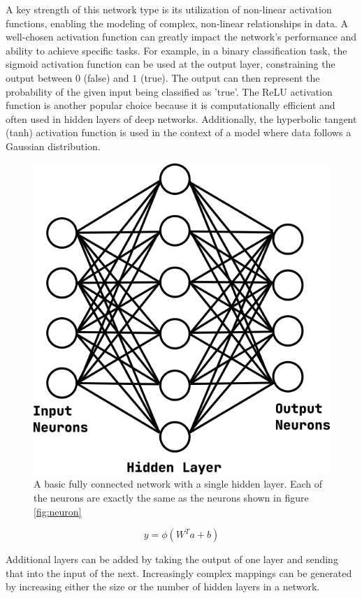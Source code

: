 A key strength of this network type is its utilization of non-linear activation functions, enabling the modeling of complex, non-linear relationships in data.
A well-chosen activation function can greatly impact the network's performance and ability to achieve specific tasks.
For example, in a binary classification task, the sigmoid activation function can be used at the output layer, constraining the output between $0$ (false) and $1$ (true).
The output can then represent the probability of the given input being classified as 'true'.
The ReLU activation function is another popular choice because it is computationally efficient and often used in hidden layers of deep networks. Additionally, the hyperbolic tangent (tanh) activation function is used in the context of a model where data follows a Gaussian distribution.

\begin{figure}[h!]
    \centering
    \includegraphics[width=0.7\linewidth]{figs/background/png/fcn.png}
    \caption{A basic fully connected network with a single hidden layer. Each of the neurons are exactly the same as the neurons shown in figure \ref{fig:neuron}}
    \label{fig:fcn}
\end{figure}

\begin{equation}
    y = \phi(W^{T}a + b)
    \label{eq:fcn}
\end{equation}

Additional layers can be added by taking the output of one layer and sending that into the input of the next. Increasingly complex mappings can be generated by increasing either the size or the number of hidden layers in a network.


